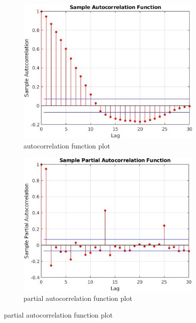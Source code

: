 \documentclass{article}
\begin{document}
\begin{figure}
    \centering
    \begin{subfigure}{.5\textwidth}
        \centering
        \includegraphics[width=1\textwidth]{acf.jpg}
        \caption{autocorrelation function plot}
        \label{fig:acf}
    \end{subfigure}%
    \begin{subfigure}{.5\textwidth}
        \centering
        \includegraphics[width=1\textwidth]{pacf.jpg}
        \caption{partial autocorrelation function plot}
        \label{fig:pacf}
    \end{subfigure}
\end{figure}
\end{document}
